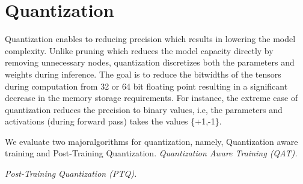 \section{Quantization}\label{quantization}

Quantization enables to reducing precision which results in lowering the model complexity.
Unlike pruning which reduces the model capacity directly by removing unnecessary nodes, quantization discretizes both the parameters and weights during inference.
The goal is to reduce the bitwidths of the tensors during computation from 32 or 64 bit floating point resulting in a significant decrease in the memory storage requirements.
For instance, the extreme case of quantization reduces the precision to binary values, i.e, the parameters and activations (during forward pass) takes the values \{+1,-1\}.

We evaluate two majoralgorithms for quantization, namely, Quantization aware training and Post-Training Quantization.
\textit{Quantization Aware Training (QAT).}

\textit{Post-Training Quantization (PTQ).}

